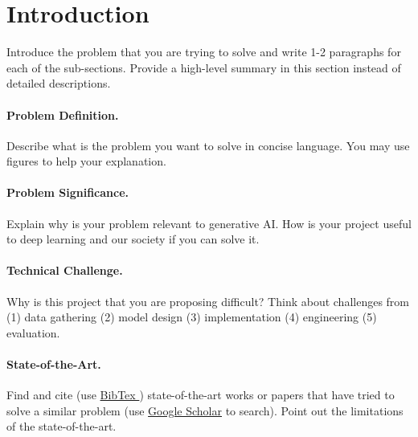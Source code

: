 \documentclass{article}
\newcommand{\new}[1]{{\color{red} #1}}
\begin{document}
\section{Introduction}
Introduce the problem that you are trying to solve and write 1-2 paragraphs for each of the sub-sections. Provide a high-level summary in this section instead of detailed descriptions.

\paragraph{Problem Definition.}
Describe  what is the problem you want to solve in concise language. You may use figures to help your explanation.


\paragraph{Problem Significance.}
Explain  why is your problem relevant to generative AI. How is your project useful to deep learning and our society if you can solve it. 

\paragraph{Technical Challenge.}
Why is this project that you are proposing difficult? Think about challenges from (1) data gathering (2) model design (3) implementation (4) engineering (5) evaluation. 

\paragraph{State-of-the-Art.}
Find and cite (use \href{https://www.overleaf.com/learn/latex/Bibliography_management_with_bibtex}{BibTex
}) state-of-the-art works or papers that have tried to solve a similar problem (use \href{https://scholar.google.com/}{Google Scholar} to search). Point out the limitations of the state-of-the-art.

\end{document}
